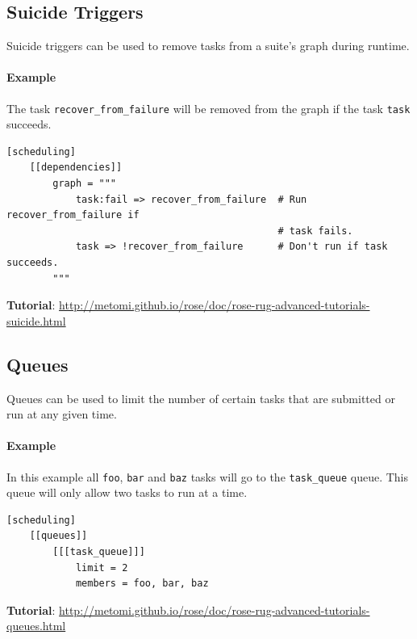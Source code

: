 \subsection{Suicide Triggers}

Suicide triggers can be used to remove tasks from a suite's graph during
runtime.

\paragraph*{Example}

The task \lstinline{recover_from_failure} will be removed from the graph if
the task \lstinline{task} succeeds.

\begin{lstlisting}
[scheduling]
    [[dependencies]]
        graph = """
            task:fail => recover_from_failure  # Run recover_from_failure if
                                               # task fails.
            task => !recover_from_failure      # Don't run if task succeeds.
        """
\end{lstlisting}

\begin{shaded*}
\textbf{Tutorial}: \url{http://metomi.github.io/rose/doc/rose-rug-advanced-tutorials-suicide.html}
\end{shaded*}

\subsection{Queues}

Queues can be used to limit the number of certain tasks that are submitted or
run at any given time.

\paragraph*{Example}

In this example all \lstinline{foo}, \lstinline{bar} and \lstinline{baz} tasks
will go to the \lstinline{task_queue} queue. This queue will only allow two
tasks to run at a time.

\begin{lstlisting}
[scheduling]
    [[queues]]
        [[[task_queue]]]
            limit = 2
            members = foo, bar, baz
\end{lstlisting}

\begin{shaded*}
\textbf{Tutorial}: \url{http://metomi.github.io/rose/doc/rose-rug-advanced-tutorials-queues.html}
\end{shaded*}

